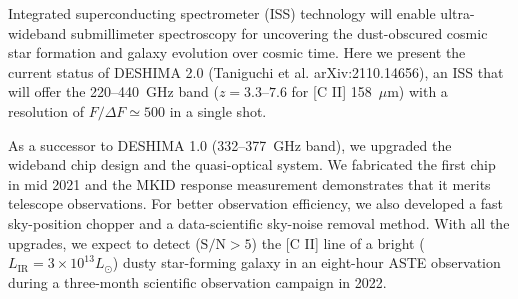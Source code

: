 \documentclass[ja]{2022a}
\begin{document}
Integrated superconducting spectrometer (ISS) technology will enable ultra-wideband submillimeter spectroscopy for uncovering the dust-obscured cosmic star formation and galaxy evolution over cosmic time.
Here we present the current status of DESHIMA 2.0 (Taniguchi et al. arXiv:2110.14656), an ISS that will offer the 220--440~GHz band ($z=3.3\textrm{--}7.6$ for [C II] 158~$\mu$m) with a resolution of $F / \Delta F \simeq 500$ in a single shot.

As a successor to DESHIMA 1.0 (332--377~GHz band), we upgraded the wideband chip design and the quasi-optical system.
We fabricated the first chip in mid 2021 and the MKID response measurement demonstrates that it merits telescope observations.
For better observation efficiency, we also developed a fast sky-position chopper and a data-scientific sky-noise removal method.
With all the upgrades, we expect to detect ($\textrm{S/N}>5$) the [C II] line of a bright ($L_{\mathrm{IR}} = 3 \times 10^{13} L_{\odot}$) dusty star-forming galaxy in an eight-hour ASTE observation during a three-month scientific observation campaign in 2022.
\end{document}
